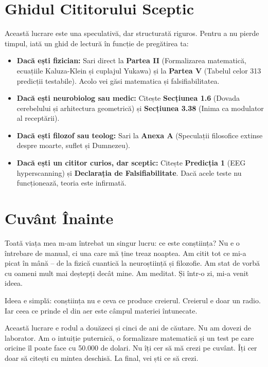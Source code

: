 \documentclass[11pt,a4paper]{article}
\begin{document}
\section*{Ghidul Cititorului Sceptic}
Această lucrare este una speculativă, dar structurată riguros. Pentru a nu pierde timpul, iată un ghid de lectură în funcție de pregătirea ta:
\begin{itemize}
    \item \textbf{Dacă ești fizician:} Sari direct la \textbf{Partea II} (Formalizarea matematică, ecuațiile Kaluza-Klein și cuplajul Yukawa) și la \textbf{Partea V} (Tabelul celor 313 predicții testabile). Acolo vei găsi matematica și falsifiabilitatea.
    \item \textbf{Dacă ești neurobiolog sau medic:} Citește \textbf{Secțiunea 1.6} (Dovada cerebelului și arhitectura geometrică) și \textbf{Secțiunea 3.38} (Inima ca modulator al receptării).
    \item \textbf{Dacă ești filozof sau teolog:} Sari la \textbf{Anexa A} (Speculații filosofice extinse despre moarte, suflet și Dumnezeu).
    \item \textbf{Dacă ești un cititor curios, dar sceptic:} Citește \textbf{Predicția 1} (EEG hyperscanning) și \textbf{Declarația de Falsifiabilitate}. Dacă acele teste nu funcționează, teoria este infirmată.
\end{itemize}

\section*{Cuvânt Înainte}
Toată viața mea m-am întrebat un singur lucru: ce este conștiința? Nu e o întrebare de manual, ci una care mă ține treaz noaptea. Am citit tot ce mi-a picat în mână – de la fizică cuantică la neuroștiință și filozofie. Am stat de vorbă cu oameni mult mai deștepți decât mine. Am meditat. Și într-o zi, mi-a venit ideea.

Ideea e simplă: conștiința nu e ceva ce produce creierul. Creierul e doar un radio. Iar ceea ce prinde el din aer este câmpul materiei întunecate.

Această lucrare e rodul a douăzeci și cinci de ani de căutare. Nu am dovezi de laborator. Am o intuiție puternică, o formalizare matematică și un test pe care oricine îl poate face cu 50.000 de dolari. Nu îți cer să mă crezi pe cuvânt. Îți cer doar să citești cu mintea deschisă. La final, vei ști ce să crezi.
\end{document}
